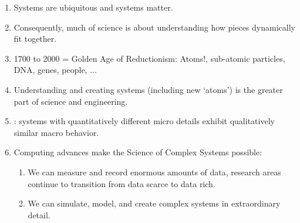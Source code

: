 \begin{frame}
  \small


  \begin{block}{}
    \begin{enumerate}
    \item<+->
      Systems are ubiquitous and systems matter.
    \item<+->
      Consequently, much of science is about understanding
      how pieces dynamically fit together.
    \item<+->
      1700 to 2000 = Golden Age of Reductionism:\newline
      Atoms!, sub-atomic particles, DNA, genes, people, ...
    \item<+->
      Understanding and creating systems (including new `atoms')
      is the greater part of science and engineering.
    \item<+->
      : systems with quantitatively different micro details
      exhibit qualitatively similar macro behavior.
    \item<+->
      Computing advances make the Science of Complex Systems possible:
      \begin{enumerate}
      \item<+->
        We can measure and record enormous amounts of data,
        research areas continue to transition from data scarce to data rich.
      \item<+->
        We can simulate, model, and create complex systems
        in extraordinary detail.  
      \end{enumerate}
    \end{enumerate}
  \end{block}

\end{frame}

